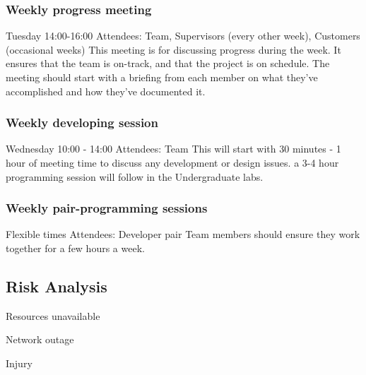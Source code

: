 \subsubsection{Weekly progress meeting}
Tuesday 14:00-16:00
Attendees: Team, Supervisors (every other week), Customers (occasional weeks)
This meeting is for discussing progress during the week. It ensures that the team is on-track, and that the project is on schedule. The meeting should start with a briefing from each member on what they've accomplished and how they've documented it.

\subsubsection{Weekly developing session}
Wednesday 10:00 - 14:00
Attendees: Team
This will start with 30 minutes - 1 hour of meeting time to discuss any development or design issues. a 3-4 hour programming session will follow in the Undergraduate labs.

\subsubsection{Weekly pair-programming sessions}
Flexible times
Attendees: Developer pair
Team members should ensure they work together for a few hours a week. 


\subsection{Risk Analysis}

Resources unavailable

Network outage

Injury
